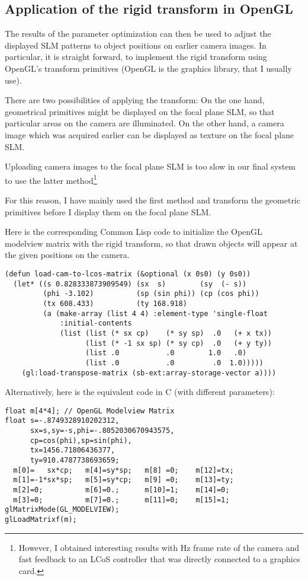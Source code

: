 \subsection{Application of the rigid transform in OpenGL}
\label{sec:map_opengl}
The results of the parameter optimization can then be used to adjust
the displayed SLM patterns to object positions on earlier camera
images. In particular, it is straight forward, to implement the rigid
transform using OpenGL's transform primitives (OpenGL is the graphics
library, that I usually use).

There are two possibilities of applying the transform: On the one
hand, geometrical primitives might be displayed on the focal plane
SLM, so that particular areas on the camera are illuminated.  On the
other hand, a camera image which was acquired earlier can be displayed
as texture on the focal plane SLM.

Uploading camera images to the focal plane SLM is too slow in our
final system to use the latter method\footnote{However, I obtained
  interesting results with \unit[30]{Hz} frame rate of the camera and
  fast feedback to an LCoS controller that was directly connected to a
  graphics card.}

For this reason, I have mainly used the first method and transform the
geometric primitives before I display them on the focal plane SLM.

Here is the corresponding Common Lisp code to initialize the OpenGL
modelview matrix with the rigid transform, so that drawn objects will
appear at the given positions on the camera.
\begin{lstlisting}[style=mylisp]
(defun load-cam-to-lcos-matrix (&optional (x 0s0) (y 0s0))
  (let* ((s 0.828333873909549) (sx  s)        (sy  (- s))
         (phi -3.102)          (sp (sin phi)) (cp (cos phi))
         (tx 608.433)          (ty 168.918)
         (a (make-array (list 4 4) :element-type 'single-float
             :initial-contents
             (list (list (* sx cp)    (* sy sp)  .0   (+ x tx))
                   (list (* -1 sx sp) (* sy cp)  .0   (+ y ty))
                   (list .0           .0        1.0   .0)
                   (list .0           .0         .0  1.0)))))
    (gl:load-transpose-matrix (sb-ext:array-storage-vector a))))    
\end{lstlisting}  
Alternatively, here is the equivalent code in C (with different
parameters):
\begin{lstlisting}[style=myclang]
float m[4*4]; // OpenGL Modelview Matrix
float s=-.8749328910202312,
      sx=s,sy=-s,phi=-.8052030670943575,
      cp=cos(phi),sp=sin(phi),
      tx=1456.71806436377,
      ty=910.4787738693659;
  m[0]=   sx*cp;   m[4]=sy*sp;   m[8] =0;    m[12]=tx; 
  m[1]=-1*sx*sp;   m[5]=sy*cp;   m[9] =0;    m[13]=ty; 
  m[2]=0;          m[6]=0.;      m[10]=1;    m[14]=0;  
  m[3]=0;          m[7]=0.;      m[11]=0;    m[15]=1;  
glMatrixMode(GL_MODELVIEW);
glLoadMatrixf(m);
\end{lstlisting}



